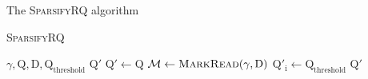 \documentclass[12pt]{beamer}
\begin{document}
    \begin{frame}{The \textsc{SparsifyRQ} algorithm}
        \begin{algorithm}[H]
            \caption{\textsc{SparsifyRQ}}
            \begin{algorithmic}[1]
                \REQUIRE \(\gamma,\text{Q},\text{D},\text{Q}_{\text{threshold}}\)
                \ENSURE \(\text{Q}'\)
                \STATE \(\text{Q}' \leftarrow \text{Q}\)
                \STATE \(\mathcal{M} \leftarrow \text{\textsc{MarkRead}}(\gamma, \text{D})\)
                        \STATE \(\text{Q}'_\text{i} \leftarrow \text{Q}_{\text{threshold}}\)
                    \ENDIF
                \ENDFOR
                \RETURN \(\text{Q}'\)
            \end{algorithmic}
        \end{algorithm}
    \end{frame}
\end{document}
